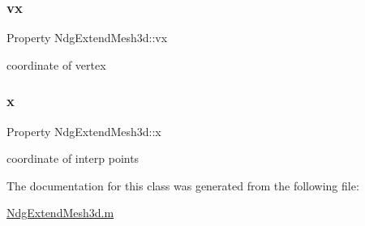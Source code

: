 \mbox{\label{class_ndg_extend_mesh3d_afb4b1254bc0cc86fc2e58b5595d37b54}} 
\subsubsection{\texorpdfstring{vx}{vx}}
{\footnotesize\ttfamily Property Ndg\+Extend\+Mesh3d\+::vx}



coordinate of vertex 

\mbox{\label{class_ndg_extend_mesh3d_adf3495103decb1d0f3b93fd0335f4d24}} 
\subsubsection{\texorpdfstring{x}{x}}
{\footnotesize\ttfamily Property Ndg\+Extend\+Mesh3d\+::x\hspace{0.3cm}{\ttfamily [protected]}}



coordinate of interp points 



The documentation for this class was generated from the following file\+:\begin{DoxyCompactItemize}
\item 
\hyperlink{_ndg_extend_mesh3d_8m}{Ndg\+Extend\+Mesh3d.\+m}\end{DoxyCompactItemize}

